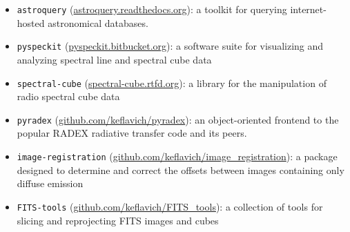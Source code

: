 \documentclass{article}
\begin{document}
\begin{itemize}
    \item \texttt{astroquery} (\url{astroquery.readthedocs.org}):
        a toolkit for querying internet-hosted astronomical databases.
    \item \texttt{pyspeckit} (\url{pyspeckit.bitbucket.org}): a software suite
        for visualizing and analyzing spectral line and spectral cube
        data
    \item \texttt{spectral-cube} (\url{spectral-cube.rtfd.org}): a library for the manipulation
        of radio spectral cube data
    \item \texttt{pyradex} (\url{github.com/keflavich/pyradex}):
        an object-oriented frontend to the popular RADEX radiative transfer code and
        its peers.
    \item \texttt{image-registration} (\url{github.com/keflavich/image_registration}):
        a package designed to determine and correct the offsets between images containing only
        diffuse emission
    \item \texttt{FITS-tools} (\url{github.com/keflavich/FITS_tools}):
        a collection of tools for slicing and reprojecting FITS images and cubes
\end{itemize}
\end{document}
